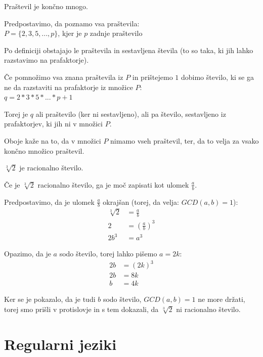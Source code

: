 \documentclass[10pt,a4paper,oneside]{book}
\begin{document}
\begin{primeri}
\item Praštevil je končno mnogo.
	\begin{items}
	\item Predpostavimo, da poznamo vsa praštevila:\\
		$P = \{2,3,5,...,p\}$, kjer je $p$ zadnje praštevilo 
	\item Po definiciji obstajajo le praštevila in sestavljena števila (to so taka, ki jih lahko razstavimo na prafaktorje). 
	\item Če pomnožimo vsa znana praštevila iz $P$ in prištejemo $1$ dobimo število, ki se ga ne da razstaviti na prafaktorje iz množice $P$:\\
		$q = 2 * 3 * 5 * ... * p + 1$
	\item Torej je $q$ ali praštevilo (ker ni sestavljeno), ali pa število, sestavljeno iz prafaktorjev, ki jih ni v množici $P$.
	\item Oboje kaže na to, da v množici $P$ nimamo vseh praštevil, ter, da to velja za vsako končno množico praštevil.
	\end{items}
\item $\sqrt[3]{2}$ je racionalno število.
	\begin{items}
	\item Če je $\sqrt[3]{2}$ racionalno število, ga je moč zapisati kot ulomek $\frac{a}{b}$.
	\item Predpostavimo, da je ulomek $\frac{a}{b}$ okrajšan (torej, da velja: $GCD(a,b)=1$):
		\begin{align*}
		\sqrt[3]{2} &= \frac{a}{b}\\
		2 &= \left( \frac{a}{b} \right)^3\\
		2b^3 &= a^3
		\end{align*}
	\item Opazimo, da je $a$ sodo število, torej lahko pišemo $a = 2k$:
		\begin{align*}
		2b &= \left( 2k\right)^3\\
		2b &= 8k\\
		b &= 4k
		\end{align*}
	\item Ker se je pokazalo, da je tudi $b$ sodo število, $GCD(a,b)=1$ ne more držati, torej smo prišli v protislovje in s tem dokazali, da $\sqrt[3]{2}$ ni racionalno število.
	\end{items}
\end{primeri}

\pagebreak
\chapter{Regularni jeziki}\label{chap:Regularni jeziki}
\end{document}
